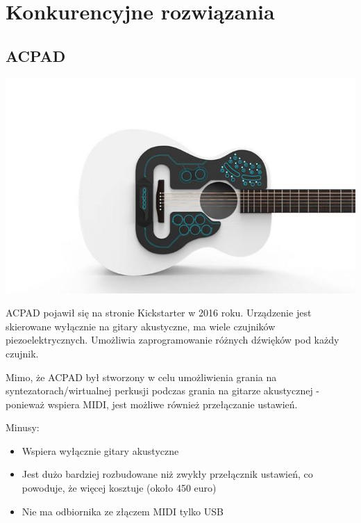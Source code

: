 \documentclass[eng,printmode]{mgr}
\begin{document}
\section{Konkurencyjne rozwiązania}
\subsection{ACPAD}
\includegraphics[width=\textwidth]{acpad}

ACPAD pojawił się na stronie Kickstarter w 2016 roku. Urządzenie jest skierowane wyłącznie na gitary akustyczne, ma wiele czujników piezoelektrycznych. Umożliwia zaprogramowanie różnych dźwięków pod każdy czujnik.

Mimo, że ACPAD był stworzony w celu umożliwienia grania na syntezatorach/wirtualnej perkusji podczas grania na gitarze akustycznej - ponieważ wspiera MIDI, jest możliwe również przełączanie ustawień.

Minusy:
\begin{itemize}
\item Wspiera wyłącznie gitary akustyczne
\item Jest dużo bardziej rozbudowane niż zwykły przełącznik ustawień, co powoduje, że więcej kosztuje (około 450 euro)
\item Nie ma odbiornika ze złączem MIDI tylko USB
\end{itemize}
\end{document}
